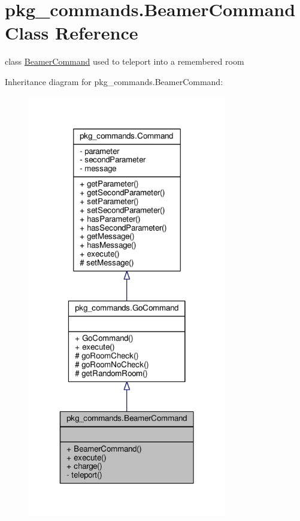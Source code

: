 \hypertarget{classpkg__commands_1_1BeamerCommand}{\section{pkg\-\_\-commands.\-Beamer\-Command Class Reference}
\label{classpkg__commands_1_1BeamerCommand}
}


class \hyperlink{classpkg__commands_1_1BeamerCommand}{Beamer\-Command} used to teleport into a remembered room  




Inheritance diagram for pkg\-\_\-commands.\-Beamer\-Command\-:
\nopagebreak
\begin{figure}[H]
\begin{center}
\leavevmode
\includegraphics[width=246pt]{classpkg__commands_1_1BeamerCommand__inherit__graph}
\end{center}
\end{figure}


